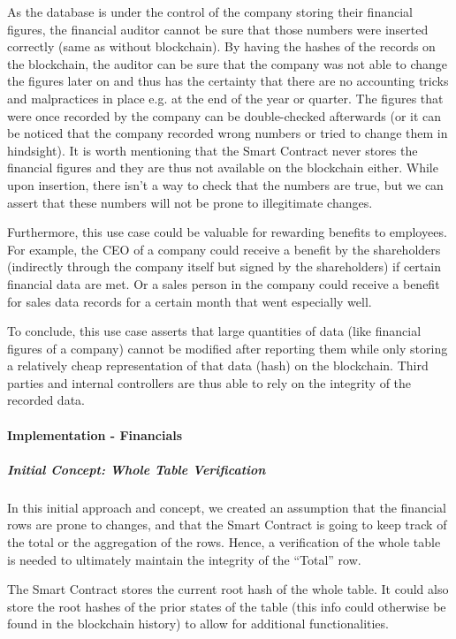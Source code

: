 As the database is under the control of the company storing their financial figures, the financial auditor cannot be sure that those numbers were inserted correctly (same as without blockchain). By having the hashes of the records on the blockchain, the auditor can be sure that the company was not able to change the figures later on and thus has the certainty that there are no accounting tricks and malpractices in place e.g. at the end of the year or quarter. The figures that were once recorded by the company can be double-checked afterwards (or it can be noticed that the company recorded wrong numbers or tried to change them in hindsight). It is worth mentioning that the Smart Contract never stores the financial figures and they are thus not available on the blockchain either. While upon insertion, there isn’t a way to check that the numbers are true, but we can assert that these numbers will not be prone to illegitimate changes.

Furthermore, this use case could be valuable for rewarding benefits to employees. For example, the CEO of a company could receive a benefit by the shareholders (indirectly through the company itself but signed by the shareholders) if certain financial data are met. Or a sales person in the company could receive a benefit for sales data records for a certain month that went especially well.

To conclude, this use case asserts that large quantities of data (like financial figures of a company) cannot be modified after reporting them while only storing a relatively cheap representation of that data (hash) on the blockchain. Third parties and internal controllers are thus able to rely on the integrity of the recorded data.

\paragraph{Implementation - Financials}
\subparagraph{Initial Concept: Whole Table Verification}

In this initial approach and concept, we created an assumption that the financial rows are prone to changes, and that the Smart Contract is going to keep track of the total or the aggregation of the rows. Hence, a verification of the whole table is needed to ultimately maintain the integrity of the “Total” row.

The Smart Contract stores the current root hash of the whole table. It could also store the root hashes of the prior states of the table (this info could otherwise be found in the blockchain history) to allow for additional functionalities.

